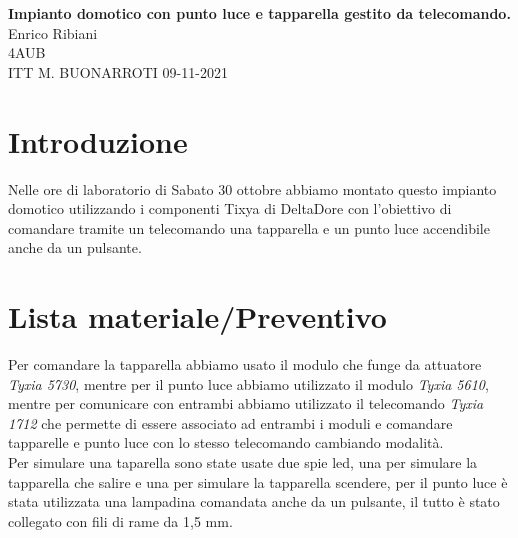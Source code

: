 \documentclass[12pt]{article}
\begin{document}
    \begin{titlepage}
\begin{flushleft}
\vspace{3\baselineskip}

\Huge{\textbf{Impianto domotico con punto luce e tapparella gestito da telecomando.}}
\vfill
\LARGE Enrico Ribiani\\
\LARGE 4AUB\\
\vfill
\huge{ITT M. BUONARROTI 09-11-2021}

\end{flushleft}
\end{titlepage}
\pagestyle{fancy}
\fancyhead{}


\tableofcontents
\vskip 3cm
\section{Introduzione}
Nelle ore di laboratorio di Sabato 30 ottobre abbiamo montato questo impianto domotico utilizzando i componenti Tixya di DeltaDore 
con l'obiettivo di comandare tramite un telecomando una tapparella e un punto luce accendibile anche da un pulsante.

\section{Lista materiale/Preventivo}
Per comandare la tapparella abbiamo usato il modulo che funge da attuatore \textit{Tyxia 5730},
mentre per il punto luce abbiamo utilizzato il modulo \textit{Tyxia 5610}, mentre per comunicare con entrambi abbiamo utilizzato
il telecomando \textit{Tyxia 1712} che permette di essere associato ad entrambi i moduli e comandare tapparelle e punto luce 
con lo stesso telecomando cambiando modalità.\\
Per simulare una taparella sono state usate due spie led, una per simulare la tapparella che salire e una per simulare la tapparella scendere, per 
il punto luce è stata utilizzata una lampadina comandata anche da un pulsante, il tutto è stato collegato con fili di rame da 1,5 mm.
\vfill    
\end{document}
